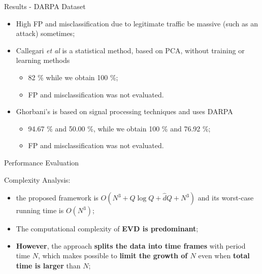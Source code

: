 \documentclass[newPxFont, numfooter, sectionpages]{beamer}
\begin{document}
\begin{frame}{Results - DARPA Dataset}
	
	\begin{itemize}
		\item High FP and misclassification due to legitimate traffic be massive (such as an attack) sometimes;
		\item Callegari \emph{et al} is a statistical method, based on PCA, without training or learning methods
		\begin{itemize}
			\item 82 \% while we obtain 100 \%;
			\item FP and misclassification was not evaluated.
		\end{itemize}
		\item Ghorbani's is based on signal processing techniques and uses DARPA
		\begin{itemize}
			\item 94.67 \% and 50.00 \%, while we obtain 100 \% and 76.92 \%;
			\item FP and misclassification was not evaluated.
		\end{itemize}
	\end{itemize}
\end{frame}
\begin{frame}{Performance Evaluation}

	Complexity Analysis:
	\begin{itemize}
		\item the proposed framework is $O(N^3 + Q \log Q + \hat{d}Q + N^3)$ and its worst-case running time is $O(N^3)$;
		\item The computational complexity of \textbf{EVD is predominant};
		\item \textbf{However}, the approach \textbf{splits the data into time frames} with period time $N$, which makes possible to \textbf{limit the growth of $N$} even when \textbf{total time is larger} than $N$;		
	\end{itemize}
	
\end{frame}
\end{document}
